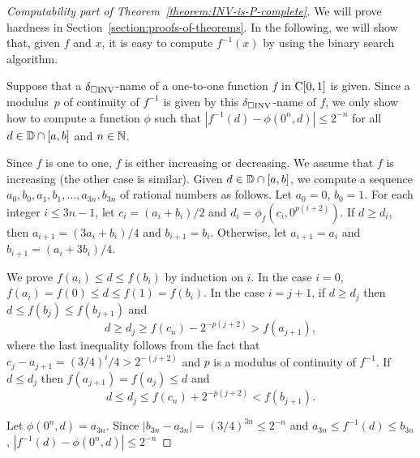 \documentclass[envcountsame,orivec,oribibl]{llncs}
\begin{document}
\begin{proof}[Computability part of Theorem~\ref{theorem:INV-is-P-complete}]
We will prove hardness in Section~\ref{section:proofs-of-theorems}.
In the following, we will show that, 
given $f$ and $x$, 
it is easy to compute $f^{-1}(x)$ by using the binary search algorithm.

Suppose that a $\delta _{\square \mathrm{INV}}$-name of a one-to-one function $f$ in $\mathrm C [0, 1]$ is given. 
Since a modulus~$p$ of continuity of $f ^{-1}$ is given by this $\delta _{\square \mathrm{INV}}$-name of $f$,
we only show how to compute a function $\phi$ such that 
$|f^{-1}(d) - \phi(0^n, d)| \le 2^{-n}$ for all $d \in \mathbb D \cap [a, b]$ and $n \in \mathbb N$.

Since $f$ is one to one, $f$ is either increasing or decreasing. 
We assume that $f$ is increasing (the other case is similar).
Given $d \in \mathbb D \cap [a, b]$, 
we compute a sequence  $a_0, b_0, a_1,b_1, \dots, a_{3n}, b_{3n}$ of rational numbers as follows.
Let $a_0 = 0$, $b_0 = 1$.
For each integer $i \le 3n-1$,
let $c_i = (a_i+b_i)/2$ and $d_i = \phi_f(c_i, 0^{p(i+2)})$.
If $d \ge d_i$, then $a_{i+1} = (3a_i+b_i)/4$ and $b_{i+1} = b_i$. 
Otherwise, let $a_{i+1} = a_i$ and $b_{i+1} = (a_i+3b_i)/4$.

We prove $f(a_i) \leq d \leq f(b_i)$ by induction on $i$.
In the case $i = 0$, $f(a_i) = f(0) \le d \le f(1) = f(b_i)$.
In the case $i=j+1$, if $d \ge d_j$ then $d \le f(b_j) \le f(b_{j+1})$ and
\begin{equation}
 d \ge d_j \ge f(c_n) - 2^{-p(j+2)} > f(a_{j+1}),
\end{equation}
where the last inequality follows from the fact that $c_j - a_{j+1} = (3/4)^i/4 > 2^{-(j+2)}$ and $p$ is a modulus of continuity of $f^{-1}$.
If $d \le d_j$ then $f(a_{j+1}) = f(a_j) \le d$ and 
\begin{equation}
 d \le d_j \le f(c_n) + 2^{-p(j+2)} < f(b_{j+1}).
\end{equation}

Let $\phi(0^n, d) = a_{3n}$.
Since $|b_{3n} - a_{3n}| = (3/4)^{3n} \le 2^{-n}$ and
$a_{3n} \le f^{-1}(d) \le b_{3n}$,
$|f^{-1}(d) - \phi(0^n, d)| \le 2^{-n}$
\end{proof}
\end{document}
